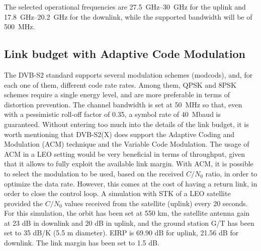 \documentclass[conference,10pt,a4paper]{IEEEtran}%
\begin{document}
The selected operational frequencies are \SIrange{27.5}{30}{\GHz} for the uplink and  \SIrange{17.8}{20.2}{\GHz} for the downlink, while the supported bandwidth will be of \SI{500}{\MHz}.

\subsection{Link budget with Adaptive Code Modulation}
The DVB-S2 standard supports several modulation schemes (modcods), and, for each one of them, different code rate rates.
Among them, QPSK and 8PSK schemes require a single energy level, and are more preferable in terms of distortion prevention.
The channel bandwidth is set at \SI{50}{\MHz} so that, even with a pessimistic roll-off factor of \num{0.35}, a symbol rate of \SI{40}{Mbaud} is guaranteed.
Without entering too much into the details of the link budget, it is worth mentioning that DVB-S2(X) does support the Adaptive Coding and Modulation (ACM) technique and the Variable Code Modulation.
The usage of ACM in a LEO setting would be very beneficial in terms of throughput, given that it allows to fully exploit the available link margin.
With ACM, it is possible to select the modulation to be used, based on the received $C/N_0$ ratio, in order to optimize the data rate.
However, this comes at the cost of having a return link, in order to close the control loop.
A simulation with STK of a LEO satellite provided the $C/N_0$ values received from the satellite (uplink) every 20 seconds.
For this simulation, the orbit has been set at 550 km, the satellite antenna gain at 23 dB in downlink and 20 dB in uplink, and the ground station G/T has been set to 35 dB/K (5.5 m diameter).
EIRP is 69.90 dB for uplink, 21.56 dB for downlink.
The link margin has been set to 1.5 dB.
\end{document}
